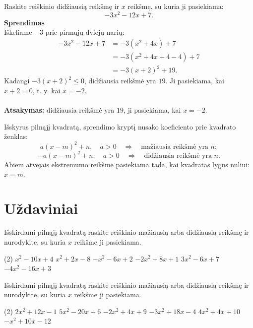 \documentclass[11pt,a4paper]{scrartcl}
\begin{document}
\begin{example}
Raskite reiškinio didžiausią reikšmę ir $x$ reikšmę, su kuria ji pasiekiama:
\[
-3x^2-12x+7.
\]
\textbf{Sprendimas}\\
Iškeliame $-3$ prie pirmųjų dviejų narių:
\[
\begin{aligned}
-3x^2-12x+7
&=-3(x^2+4x)+7\\
&=-3(x^2+4x+4-4)+7\\
&=-3(x+2)^2+19.
\end{aligned}
\]
Kadangi $-3(x+2)^2\leq0$, didžiausia reikšmė yra $19$. Ji pasiekiama, kai $x+2=0$, t. y. kai $x=-2$.\\ \\
\textbf{Atsakymas:} didžiausia reikšmė yra $19$, ji pasiekiama, kai $x=-2$.
\end{example}

\begin{remark}
Išskyrus pilnąjį kvadratą, sprendimo kryptį nusako koeficiento prie kvadrato ženklas:
\[
a(x-m)^2+n,\quad a>0 \quad \Rightarrow \quad \text{mažiausia reikšmė yra } n;
\]
\[
-a(x-m)^2+n,\quad a>0 \quad \Rightarrow \quad \text{didžiausia reikšmė yra } n.
\]
Abiem atvejais ekstremumo reikšmė pasiekiama tada, kai kvadratas lygus nuliui: $x=m$.
\end{remark}

\section{Uždaviniai}

\begin{problem}
Išskirdami pilnąjį kvadratą raskite reiškinio mažiausią arba didžiausią reikšmę ir nurodykite, su kuria $x$ reikšme ji pasiekiama.
\begin{tasks}[label={(\arabic*)}, label-offset=0.9em](2)
	\task $x^2-10x+4$
	\task $x^2+2x-8$
	\task $-x^2-6x+2$
	\task $-2x^2+8x+1$
	\task $3x^2-6x+7$
	\task $-4x^2-16x+3$
\end{tasks}
\end{problem}

\begin{problem}
Išskirdami pilnąjį kvadratą raskite reiškinio mažiausią arba didžiausią reikšmę ir nurodykite, su kuria $x$ reikšme ji pasiekiama.
\begin{tasks}[label={(\arabic*)}, label-offset=0.9em](2)
	\task $2x^2+12x-1$
	\task $5x^2-20x+6$
	\task $-2x^2+4x+9$
	\task $-3x^2+18x-4$
	\task $4x^2+4x+10$
	\task $-x^2+10x-12$
\end{tasks}
\end{problem}
\end{document}
